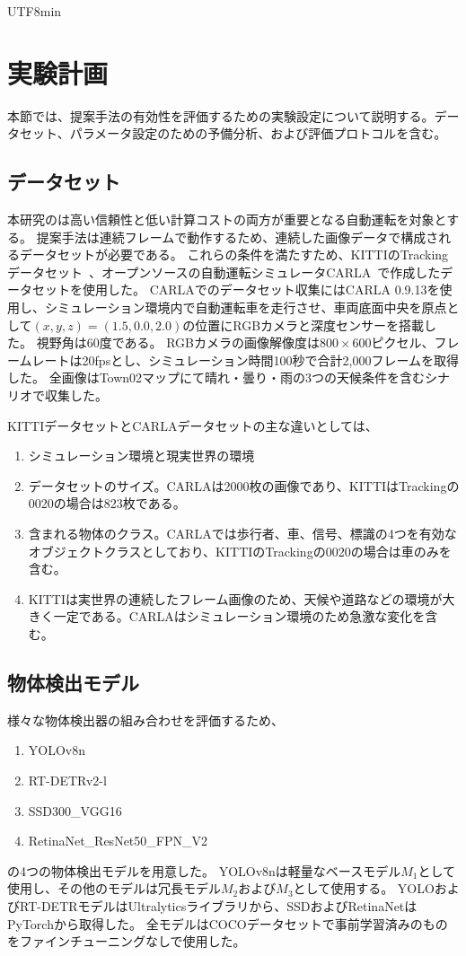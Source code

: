 \documentclass[conference, dvipdfmx]{IEEEtran}
\begin{document}
\begin{CJK}{UTF8}{min}
\section{実験計画}
\label{sec:experiment plan}
本節では、提案手法の有効性を評価するための実験設定について説明する。データセット、パラメータ設定のための予備分析、および評価プロトコルを含む。

\subsection{データセット}\label{sec:dataset}
本研究のは高い信頼性と低い計算コストの両方が重要となる自動運転を対象とする。
提案手法は連続フレームで動作するため、連続した画像データで構成されるデータセットが必要である。
これらの条件を満たすため、KITTIのTracking データセット~\cite{KITTI}、オープンソースの自動運転シミュレータCARLA~\cite{CARLA2017}で作成したデータセットを使用した。
CARLAでのデータセット収集にはCARLA 0.9.13を使用し、シミュレーション環境内で自動運転車を走行させ、車両底面中央を原点として$(x, y, z) = (1.5, 0.0, 2.0)$の位置にRGBカメラと深度センサーを搭載した。
視野角は60度である。
RGBカメラの画像解像度は$800 \times 600$ピクセル、フレームレートは20fpsとし、シミュレーション時間100秒で合計2{,}000フレームを取得した。
全画像はTown02マップにて晴れ・曇り・雨の3つの天候条件を含むシナリオで収集した。

KITTIデータセットとCARLAデータセットの主な違いとしては、
\begin{enumerate}
    \item シミュレーション環境と現実世界の環境
    \item データセットのサイズ。CARLAは2000枚の画像であり、KITTIはTrackingの0020の場合は823枚である。
    \item 含まれる物体のクラス。CARLAでは歩行者、車、信号、標識の4つを有効なオブジェクトクラスとしており、KITTIのTrackingの0020の場合は車のみを含む。
    \item KITTIは実世界の連続したフレーム画像のため、天候や道路などの環境が大きく一定である。CARLAはシミュレーション環境のため急激な変化を含む。
\end{enumerate}

\subsection{物体検出モデル}
様々な物体検出器の組み合わせを評価するため、
\begin{enumerate}
    \item YOLOv8n~\cite{YOLOv8}
    \item RT-DETRv2-l~\cite{RTDETRv2}
    \item SSD300\_VGG16~\cite{SSD2016}
    \item RetinaNet\_ResNet50\_FPN\_V2~\cite{RetinaNet2020}
\end{enumerate}
の4つの物体検出モデルを用意した。
YOLOv8nは軽量なベースモデル$M_1$として使用し、その他のモデルは冗長モデル$M_2$および$M_3$として使用する。
YOLOおよびRT-DETRモデルはUltralyticsライブラリから、SSDおよびRetinaNetはPyTorchから取得した。
全モデルはCOCOデータセットで事前学習済みのものをファインチューニングなしで使用した。


\end{CJK}
\end{document}
